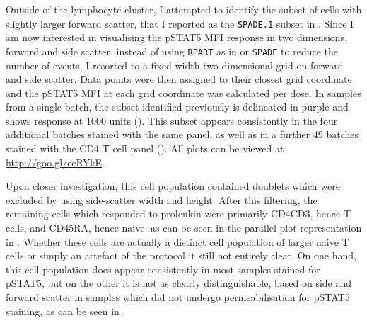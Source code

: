 Outside of the lymphocyte cluster, I attempted to identify the subset of cells with slightly larger forward scatter, that I reported as the \texttt{SPADE.1} subset in .
Since I am now interested in visualising the pSTAT5 MFI response in two dimensions, forward and side scatter, instead of using \texttt{RPART} as in  or \texttt{SPADE} to reduce the number of events, I resorted to a fixed width two-dimensional grid on forward and side scatter.
Data points were then assigned to their closest grid coordinate and the pSTAT5 MFI at each grid coordinate was calculated per dose.
In samples from a single batch, the subset identified previously is delineated in purple and shows response at 1000 units ().
This subset appears consistently in the four additional batches stained with the same panel,
as well as in a further $49$ batches stained with the CD4 T cell panel ().
All plots can be viewed at \url{http://goo.gl/eeRYkE}.

Upon closer investigation, this cell population contained doublets which were excluded by using side-scatter width and height.
After this filtering, the remaining cells which responded to proleukin were primarily CD4\positive CD3\positive, hence T cells, and CD45RA\positive, hence naive, as can be seen in the parallel plot representation in .
Whether these cells are actually a distinct cell population of larger naive T cells or simply an artefact of the protocol it still not entirely clear.
On one hand, this cell population does appear consistently in most samples stained for pSTAT5, but on the other it is not as clearly distinguishable, based on side and forward scatter in samples which did not undergo permeabilisation for pSTAT5 staining, as can be seen in .


